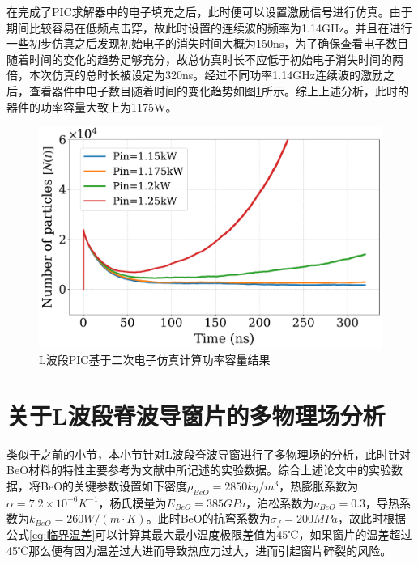 \documentclass[master]{thesis-uestc}
\begin{document}
在完成了PIC求解器中的电子填充之后，此时便可以设置激励信号进行仿真。由于期间比较容易在低频点击穿，故此时设置的连续波的频率为1.14GHz。并且在进行一些初步仿真之后发现初始电子的消失时间大概为150ns，为了确保查看电子数目随着时间的变化的趋势足够充分，故总仿真时长不应低于初始电子消失时间的两倍，本次仿真的总时长被设定为320ns。经过不同功率1.14GHz连续波的激励之后，查看器件中电子数目随着时间的变化趋势如图\ref{fig:L波段PIC基于二次电子仿真计算功率容量结果}所示。综上上述分析，此时的器件的功率容量大致上为1175W。
\begin{figure}[!htb]
    \centering
    \includegraphics[width=0.65\linewidth]{pic/chapter4/particle_time_chapter4.pdf}
    \caption{L波段PIC基于二次电子仿真计算功率容量结果}
    \label{fig:L波段PIC基于二次电子仿真计算功率容量结果}
\end{figure}

\section{关于L波段脊波导窗片的多物理场分析}
类似于之前的小节，本小节针对L波段脊波导窗进行了多物理场的分析，此时针对BeO材料的特性主要参考为文献\cite{thumm_stateart_2020, slack_thermal_1971,kozlovskii_thermal_2014,hanyong_diff_2011}中所记述的实验数据。综合上述论文中的实验数据，将BeO的关键参数设置如下密度\(\rho_{BeO} = 2850kg/m^3\)，热膨胀系数为\(\alpha = 7.2 \times 10^{-6} K^{-1}\)，杨氏模量为\(E_{BeO} = 385GPa\)，泊松系数为\(\nu_{BeO} = 0.3\)，导热系数为\(k_{BeO} = 260 W/(m \cdot K)\)。此时BeO的抗弯系数为$\sigma_f = 200MPa$，故此时根据公式\ref{eq:临界温差}可以计算其最大最小温度极限差值为45℃，如果窗片的温差超过45℃那么便有因为温差过大进而导致热应力过大，进而引起窗片碎裂的风险。
\end{document}
